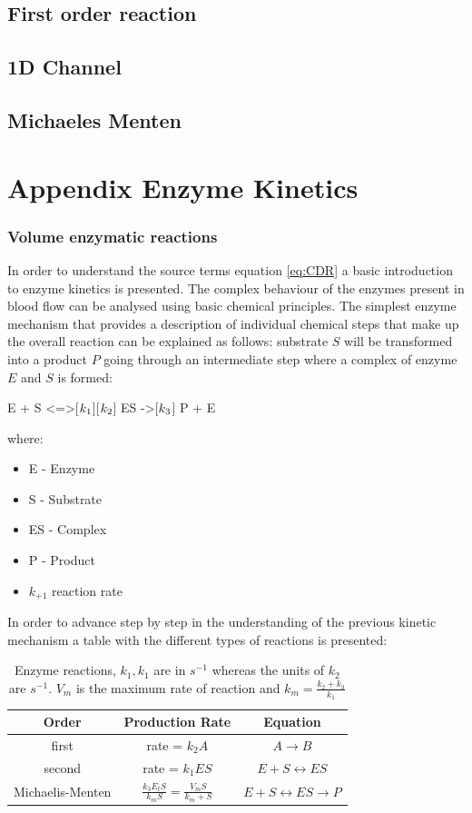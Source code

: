 \documentclass[%
 nofootinbib,
 amsmath,amssymb,
 aps,
 pra,
]{revtex4-1}
\begin{document}
\subsection{First order reaction}
\subsection{1D Channel}
\subsection{Michaeles Menten}

\section{Appendix Enzyme Kinetics}
\subsubsection{Volume enzymatic reactions}
In order to understand the source terms equation \ref{eq:CDR} a basic introduction to enzyme kinetics is presented. The complex behaviour of the enzymes present in blood flow can be analysed using basic chemical principles. The simplest enzyme mechanism that provides a description of individual chemical steps that make up the overall reaction can be explained as follows: substrate $S$ will be transformed into a product $P$ going through an intermediate step where a complex of enzyme $E$ and $S$ is formed: 
\begin{reaction}
E + S <=>[$k\sb{1}$][$k\sb{2}$] ES ->[$k\sb{3}$] P + E
\end{reaction}
where:
\begin{itemize}
\item E - Enzyme 
\item S - Substrate
\item ES - Complex
\item P - Product
\item $k_{+1}$ reaction rate 
\end{itemize}
In order to advance step by step in the understanding of the previous kinetic mechanism a table with the different types of reactions is presented:\\
\begin{table}[h]
\begin{tabular}{c c c}
\hline
\textbf{Order} & \textbf{Production Rate} & \textbf{Equation} \\
\hline
first & rate = $k_{2} A  $ & $A \rightarrow B$ \\
second & rate = $k_{1} E S$ & $E + S \leftrightarrow ES $\\
Michaelis-Menten & $ \frac{k_{3} E_{t} S }{k_{m} S} = \frac{V_{m} S}{k_{m} + S} $ & $E + S \leftrightarrow ES \rightarrow P  $ \\
\hline  
\end{tabular}\caption{\label{tab:Enzyme} Enzyme reactions, $ k_{1}, k_{1}$ are in $s^{-1}$ whereas the units of $k_{2}$ are $s^{-1}$. $V_{m}$ is the maximum rate of reaction and $k_{m} = \frac{k_{2} + k_{3} }{k_{1}} $}
\end{table}
\end{document}
